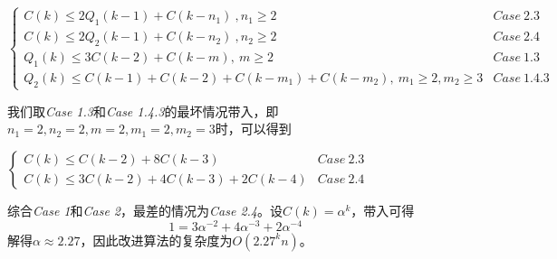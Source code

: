 \begin{center}
$\left\{
\begin{array}{lr}
	C(k) \le 2Q_1(k-1) + C(k-n_1)~,n_1 \ge 2 & Case~2.3 \\
	C(k) \le 2Q_2(k-1) + C(k-n_2)~,n_2 \ge 2 & Case~2.4 \\
	Q_1(k) \le 3C(k-2) + C(k-m),~m \ge 2 & Case~1.3 \\
	Q_2(k) \le C(k-1)+C(k-2) + C(k-m_1) + C(k-m_2),~m_1 \ge 2, m_2 \ge 3 & Case~1.4.3
\end{array}
\right.$
\end{center}

我们取\textit{Case 1.3}和\textit{Case 1.4.3}的最坏情况带入，即$n_1 = 2, n_2 = 2 ,m = 2, m_1 = 2, m_2 = 3$时，可以得到
\begin{center}
$\left\{
\begin{array}{lr}
	C(k) \le C(k-2) + 8C(k-3) & Case~2.3 \\
	C(k) \le 3C(k-2) + 4C(k-3) + 2C(k-4)& Case~2.4
\end{array}
\right.$
\end{center}

综合\textit{Case 1}和\textit{Case 2}，最差的情况为\textit{Case 2.4}。设$C(k) = \alpha ^ k$，带入可得
\begin{equation*}
 1 = 3\alpha ^ {-2} + 4\alpha ^ {-3} + 2\alpha ^{-4}
\end{equation*}
解得$\alpha \approx 2.27$，因此改进算法的复杂度为$O(2.27^kn)$。






















































